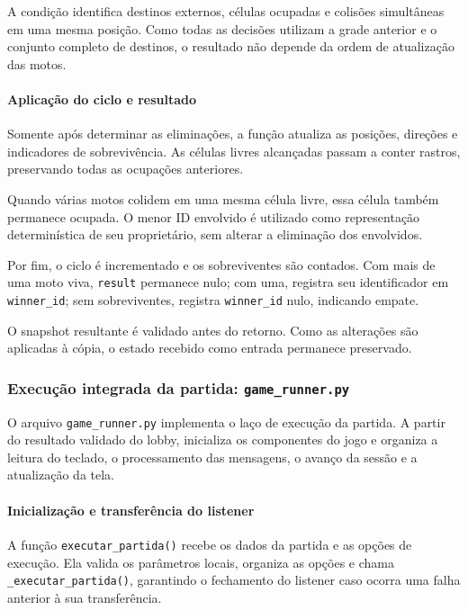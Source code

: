\documentclass[11pt,a4paper]{article}
\begin{document}
A condição identifica destinos externos, células ocupadas e colisões simultâneas em uma mesma posição. Como todas as decisões utilizam a grade anterior e o conjunto completo de destinos, o resultado não depende da ordem de atualização das motos.

\paragraph{Aplicação do ciclo e resultado}

Somente após determinar as eliminações, a função atualiza as posições, direções e indicadores de sobrevivência. As células livres alcançadas passam a conter rastros, preservando todas as ocupações anteriores.

Quando várias motos colidem em uma mesma célula livre, essa célula também permanece ocupada. O menor ID envolvido é utilizado como representação determinística de seu proprietário, sem alterar a eliminação dos envolvidos.

Por fim, o ciclo é incrementado e os sobreviventes são contados. Com mais de uma moto viva, \texttt{result} permanece nulo; com uma, registra seu identificador em \texttt{winner\_id}; sem sobreviventes, registra \texttt{winner\_id} nulo, indicando empate.

O snapshot resultante é validado antes do retorno. Como as alterações são aplicadas à cópia, o estado recebido como entrada permanece preservado.

\subsubsection{Execução integrada da partida: \texttt{game\_runner.py}}
\label{sec:implementacao-runner}

O arquivo \texttt{game\_runner.py} implementa o laço de execução da partida. A partir do resultado validado do lobby, inicializa os componentes do jogo e organiza a leitura do teclado, o processamento das mensagens, o avanço da sessão e a atualização da tela.

\paragraph{Inicialização e transferência do listener}

A função \texttt{executar\_partida()} recebe os dados da partida e as opções de execução. Ela valida os parâmetros locais, organiza as opções e chama \texttt{\_executar\_partida()}, garantindo o fechamento do listener caso ocorra uma falha anterior à sua transferência.
\end{document}
